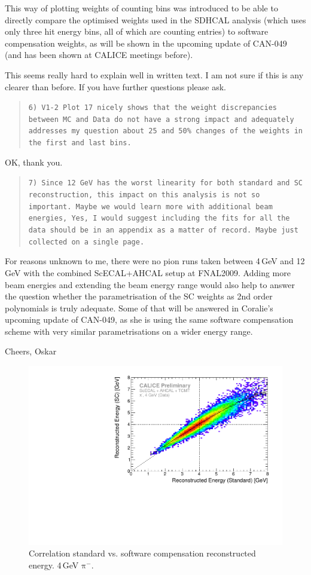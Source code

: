\documentclass[twoside,a4paper,12pt]{article}
\newcommand\piminus{\(\mathrm{\pi^-}\)}
\begin{document}
This way of plotting weights of counting bins was introduced to be able to directly compare the optimised weights used in the SDHCAL analysis (which uses only three hit energy bins, all of which are counting entries) to software compensation weights, as will be shown in the upcoming update of CAN-049 (and has been shown at CALICE meetings before).

This seems really hard to explain well in written text. I am not sure if this is any clearer than before. If you have further questions please ask. 

\begin{quote}\texttt{6) V1-2 Plot 17 nicely shows that the weight discrepancies between MC and
Data do not have a strong impact and adequately addresses my question
about 25 and 50\% changes of the weights in the first and last bins.}\end{quote}
OK, thank you.

\begin{quote}\texttt{7) Since 12 GeV has the worst linearity for both standard and SC
reconstruction, this impact on this analysis is not so important.  Maybe
we would learn more with additional beam energies, Yes, I would suggest
including the fits for all the data should be in an appendix as a matter
of record.  Maybe just collected on a single page.}\end{quote}
For reasons unknown to me, there were no pion runs taken between 4\,GeV and 12\,GeV with the combined ScECAL+AHCAL setup at FNAL2009. Adding more beam energies and extending the beam energy range would also help to answer the question whether the parametrisation of the SC weights as 2nd order polynomials is truly adequate. Some of that will be answered in Coralie's upcoming update of CAN-049, as she is using the same software compensation scheme with very similar parametrisations on a wider energy range. 

Cheers,
Oskar

\clearpage
\begin{figure}[htbp]
\begin{center}
\includegraphics[width=1\textwidth,page=1]{ERec_corr_560506_data}
\caption{Correlation standard vs. software compensation reconstructed energy. 4\,GeV \piminus.}
\label{fig:erec_4gev}
\end{center}
\end{figure}
\end{document}
